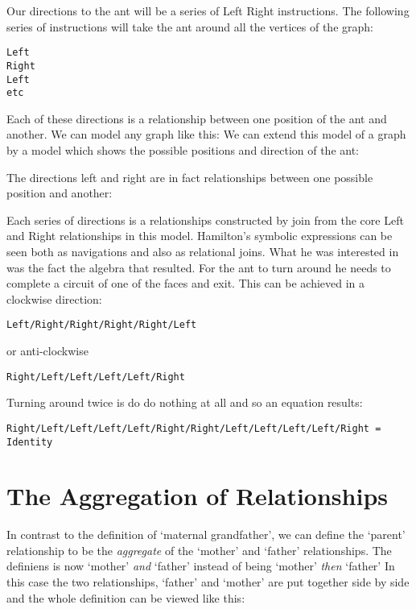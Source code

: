 \noindent  Our directions to the ant will be a series of Left Right instructions. The following series of instructions will take the ant around all the vertices of the graph:

\begin{verbatim}
Left
Right
Left
etc
\end{verbatim}
\noindent Each of these directions is a relationship between one position of the ant and another. 
\noindent We can model any graph like this:
\noindent We can extend this model of a graph by a model which shows the possible positions and direction of the ant:
\begin{center}

\end{center}
\noindent The directions left and right are in fact relationships between one possible position and another:
\begin{center}

\end{center}
\noindent Each series of directions is a relationships constructed by join from the core Left and Right relationships in this model. Hamilton's symbolic expressions can be seen both as navigations and also as relational joins.  What he was interested in was the fact the algebra that resulted. For the ant to turn around he needs to complete a circuit of one of the faces and exit. This can be achieved in a clockwise direction:
\begin{verbatim}
Left/Right/Right/Right/Right/Left
\end{verbatim}
or anti-clockwise
\begin{verbatim}
Right/Left/Left/Left/Left/Right
\end{verbatim}

\noindent Turning around twice is do do nothing at all and so an equation results:
\begin{verbatim}
Right/Left/Left/Left/Left/Right/Right/Left/Left/Left/Left/Right = Identity
\end{verbatim}

\section{The Aggregation of Relationships}
\noindent In contrast to the definition of `maternal grandfather', we can define the `parent' relationship 
to be the \textit{aggregate} of the `mother' and `father' relationships. The definiens is 
now `mother' \textit{and} `father' instead of being `mother' \textit{then} `father' In this case 
the two relationships, `father' and `mother' are put together side by side and the whole definition 
can be viewed like this:
\begin{equation}
\raisebox{-1.725cm}{

}
\end{equation}

